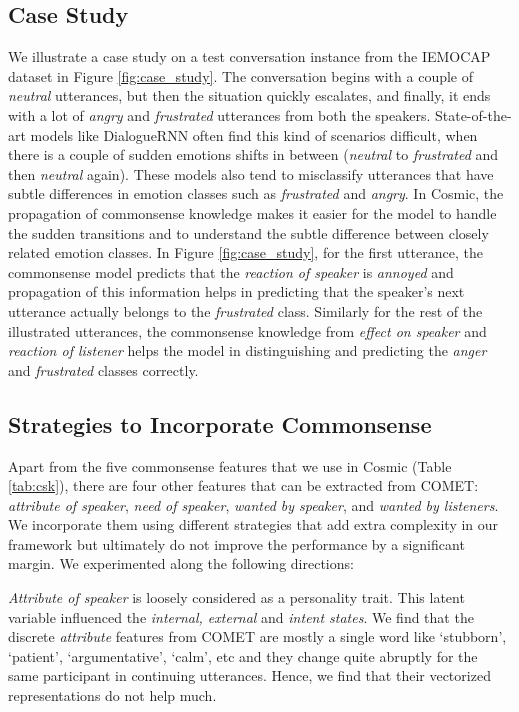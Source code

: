 \documentclass[11pt,a4paper]{article}
\begin{document}
\subsection{Case Study}
We illustrate a case study on a test conversation instance from the IEMOCAP dataset in Figure \ref{fig:case_study}. The conversation begins with a couple of \textit{neutral} utterances, but then the situation quickly escalates, and finally, it ends with a lot of \textit{angry} and \textit{frustrated} utterances from both the speakers. State-of-the-art models like DialogueRNN often find this kind of scenarios difficult, when there is a couple of sudden emotions shifts in between (\textit{neutral} to \textit{frustrated} and then \textit{neutral} again). These models also tend to misclassify utterances that have subtle differences in emotion classes such as \textit{frustrated} and \textit{angry}. In {\sc Cosmic}, the propagation of commonsense knowledge makes it easier for the model to handle the sudden transitions and to understand the subtle difference between closely related emotion classes. In Figure \ref{fig:case_study}, for the first utterance, the commonsense model predicts that the \textit{reaction of speaker} is \textit{annoyed} and propagation of this information helps in predicting that the speaker's next utterance actually belongs to the \textit{frustrated} class. Similarly for the rest of the illustrated utterances, the commonsense knowledge from \textit{effect on speaker} and \textit{reaction of listener} helps the model in distinguishing and predicting the \textit{anger} and \textit{frustrated} classes correctly.

\subsection{Strategies to Incorporate Commonsense} Apart from the five commonsense features that we use in {\sc Cosmic} (Table \ref{tab:csk}), there are four other features that can be extracted from COMET: \textit{attribute of speaker}, \textit{need of speaker}, \textit{wanted by speaker}, and \textit{wanted by listeners}. We incorporate them using different strategies that  add extra complexity in our framework but ultimately do not improve the performance by a significant margin. We experimented along the following directions:

 \textit{Attribute of speaker} is loosely considered as a personality trait.
This latent variable influenced the \textit{internal, external} and \textit{intent states}. We find that the discrete \textit{attribute} features from COMET are mostly a single word like `stubborn', `patient', `argumentative', `calm', etc and they change quite abruptly for the same participant in continuing utterances. Hence, we find that their vectorized representations do not help much.
\end{document}

